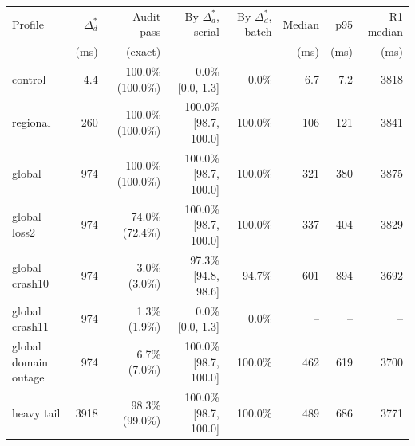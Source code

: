 \begin{tabular}{@{}lrrrrrrr@{}}
\toprule
Profile & $\Delta_d^{*}$ & Audit pass & By $\Delta_d^{*}$, serial & By $\Delta_d^{*}$, batch & Median & p95 & R1 median\\
 & (ms) & (exact) & & & (ms) & (ms) & (ms)\\
\midrule
control & 4.4 & 100.0\% (100.0\%) & 0.0\% [0.0, 1.3] & 0.0\% & 6.7 & 7.2 & 3818\\
regional & 260 & 100.0\% (100.0\%) & 100.0\% [98.7, 100.0] & 100.0\% & 106 & 121 & 3841\\
global & 974 & 100.0\% (100.0\%) & 100.0\% [98.7, 100.0] & 100.0\% & 321 & 380 & 3875\\
global loss2 & 974 & 74.0\% (72.4\%) & 100.0\% [98.7, 100.0] & 100.0\% & 337 & 404 & 3829\\
global crash10 & 974 & 3.0\% (3.0\%) & 97.3\% [94.8, 98.6] & 94.7\% & 601 & 894 & 3692\\
global crash11 & 974 & 1.3\% (1.9\%) & 0.0\% [0.0, 1.3] & 0.0\% & -- & -- & --\\
global domain outage & 974 & 6.7\% (7.0\%) & 100.0\% [98.7, 100.0] & 100.0\% & 462 & 619 & 3700\\
heavy tail & 3918 & 98.3\% (99.0\%) & 100.0\% [98.7, 100.0] & 100.0\% & 489 & 686 & 3771\\
\bottomrule
\end{tabular}
